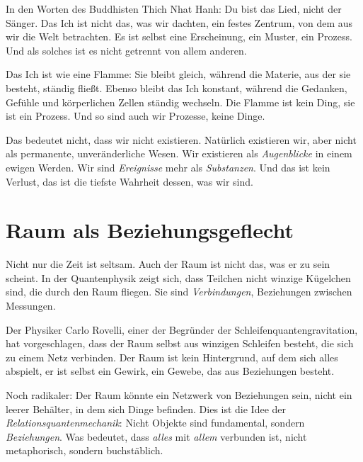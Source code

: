 In den Worten des Buddhisten Thich Nhat Hanh: \glqq Du bist das Lied, nicht der Sänger.\grqq{} Das Ich ist nicht das, was wir dachten, ein festes Zentrum, von dem aus wir die Welt betrachten. Es ist selbst eine Erscheinung, ein Muster, ein Prozess. Und als solches ist es nicht getrennt von allem anderen.

\begin{bsp}
	Das Ich ist wie eine Flamme: Sie bleibt \glqq gleich\grqq{}, während die Materie, aus der sie besteht, ständig fließt. Ebenso bleibt das \glqq Ich\grqq{} konstant, während die Gedanken, Gefühle und körperlichen Zellen ständig wechseln. Die Flamme ist kein Ding, sie ist ein Prozess. Und so sind auch wir Prozesse, keine Dinge.
\end{bsp}

Das bedeutet nicht, dass wir nicht existieren. Natürlich existieren wir, aber nicht als permanente, unveränderliche Wesen. Wir existieren als \emph{Augenblicke} in einem ewigen Werden. Wir sind \emph{Ereignisse} mehr als \emph{Substanzen}. Und das ist kein Verlust, das ist die tiefste Wahrheit dessen, was wir sind.

\section{Raum als Beziehungsgeflecht}

Nicht nur die Zeit ist seltsam. Auch der Raum ist nicht das, was er zu sein scheint. In der Quantenphysik zeigt sich, dass Teilchen nicht winzige Kügelchen sind, die durch den Raum fliegen. Sie sind \emph{Verbindungen}, Beziehungen zwischen Messungen.

Der Physiker Carlo Rovelli, einer der Begründer der Schleifenquantengravitation, hat vorgeschlagen, dass der Raum selbst aus winzigen Schleifen besteht, die sich zu einem Netz verbinden. Der Raum ist kein Hintergrund, auf dem sich alles abspielt, er ist selbst ein Gewirk, ein Gewebe, das aus Beziehungen besteht.

Noch radikaler: Der Raum könnte ein Netzwerk von Beziehungen sein, nicht ein leerer Behälter, in dem sich Dinge befinden. Dies ist die Idee der \emph{Relationsquantenmechanik}: Nicht Objekte sind fundamental, sondern \emph{Beziehungen}. Was bedeutet, dass \emph{alles} mit \emph{allem} verbunden ist, nicht metaphorisch, sondern buchstäblich.

